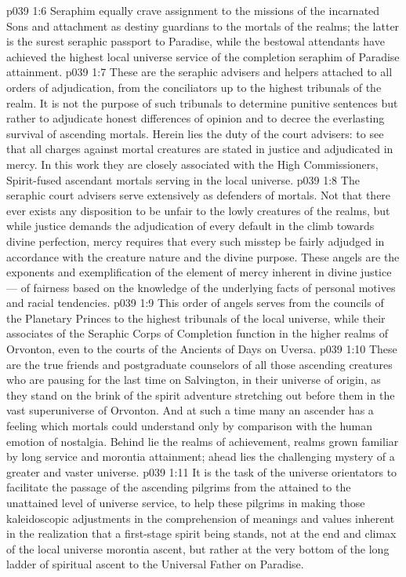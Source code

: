 \vs p039 1:6 Seraphim equally crave assignment to the missions of the incarnated Sons and attachment as destiny guardians to the mortals of the realms; the latter is the surest seraphic passport to Paradise, while the bestowal attendants have achieved the highest local universe service of the completion seraphim of Paradise attainment.
\vs p039 1:7 \pc {}\bibnobreakspace {} These are the seraphic advisers and helpers attached to all orders of adjudication, from the conciliators up to the highest tribunals of the realm. It is not the purpose of such tribunals to determine punitive sentences but rather to adjudicate honest differences of opinion and to decree the everlasting survival of ascending mortals. Herein lies the duty of the court advisers: to see that all charges against mortal creatures are stated in justice and adjudicated in mercy. In this work they are closely associated with the High Commissioners, Spirit\hyp{}fused ascendant mortals serving in the local universe.
\vs p039 1:8 The seraphic court advisers serve extensively as defenders of mortals. Not that there ever exists any disposition to be unfair to the lowly creatures of the realms, but while justice demands the adjudication of every default in the climb towards divine perfection, mercy requires that every such misstep be fairly adjudged in accordance with the creature nature and the divine purpose. These angels are the exponents and exemplification of the element of mercy inherent in divine justice --- of fairness based on the knowledge of the underlying facts of personal motives and racial tendencies.
\vs p039 1:9 This order of angels serves from the councils of the Planetary Princes to the highest tribunals of the local universe, while their associates of the Seraphic Corps of Completion function in the higher realms of Orvonton, even to the courts of the Ancients of Days on Uversa.
\vs p039 1:10 \pc {}\bibnobreakspace {} These are the true friends and postgraduate counselors of all those ascending creatures who are pausing for the last time on Salvington, in their universe of origin, as they stand on the brink of the spirit adventure stretching out before them in the vast superuniverse of Orvonton. And at such a time many an ascender has a feeling which mortals could understand only by comparison with the human emotion of nostalgia. Behind lie the realms of achievement, realms grown familiar by long service and morontia attainment; ahead lies the challenging mystery of a greater and vaster universe.
\vs p039 1:11 It is the task of the universe orientators to facilitate the passage of the ascending pilgrims from the attained to the unattained level of universe service, to help these pilgrims in making those kaleidoscopic adjustments in the comprehension of meanings and values inherent in the realization that a first\hyp{}stage spirit being stands, not at the end and climax of the local universe morontia ascent, but rather at the very bottom of the long ladder of spiritual ascent to the Universal Father on Paradise.
